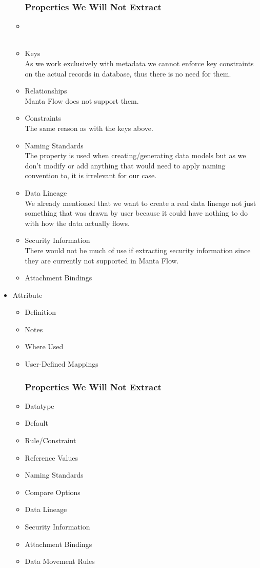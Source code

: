 \begin{itemize}
\begin{itemize}
		\subsubsection{Properties We Will Not Extract}
		\item {} \\
		 \\
		\item Keys \\
		As we work exclusively with metadata we cannot enforce key constraints on the actual records in database, thus there is no need for them.
		\item Relationships \\
		Manta Flow does not support them.
		\item Constraints \\
		The same reason as with the keys above.
		\item Naming Standards \\ 
		The property is used when creating/generating data models but as we don't modify or add anything that would need to apply naming convention to, it is irrelevant for our case.
		\item Data Lineage \\
		We already mentioned that we want to create a real data lineage not just something that was drawn by user because it could have nothing to do with how the data actually flows.
		\item Security Information \\
		There would not be much of use if extracting security information since they are currently not supported in Manta Flow.
		\item Attachment Bindings \\
	\end{itemize}
	\item Attribute
	\begin{itemize}
		\item Definition
		\item Notes
		\item Where Used
		\item User-Defined Mappings
		\subsubsection{Properties We Will Not Extract}
		\item Datatype
		\item Default
		\item Rule/Constraint
		\item Reference Values
		\item Naming Standards
		\item Compare Options
		\item Data Lineage
		\item Security Information
		\item Attachment Bindings
		\item Data Movement Rules
	\end{itemize}

\end{itemize}
